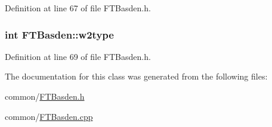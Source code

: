 Definition at line 67 of file FTBasden.h.

\hypertarget{classFTBasden_ac2f9b89d66840aba0f7ce01e5d3d0386}{
\subsubsection[{w2type}]{\setlength{\rightskip}{0pt plus 5cm}int {\bf FTBasden::w2type}}}
\label{classFTBasden_ac2f9b89d66840aba0f7ce01e5d3d0386}


Definition at line 69 of file FTBasden.h.



The documentation for this class was generated from the following files:\begin{DoxyCompactItemize}
\item 
common/\hyperlink{FTBasden_8h}{FTBasden.h}\item 
common/\hyperlink{FTBasden_8cpp}{FTBasden.cpp}\end{DoxyCompactItemize}
